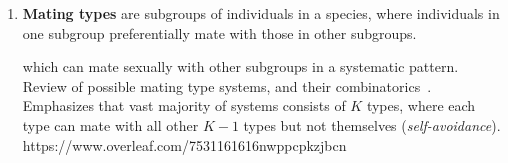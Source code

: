 \documentclass{report}
\begin{document}
\begin{enumerate}



\item \textbf{Mating types} are subgroups of individuals in a species, where individuals in one subgroup preferentially mate with those in other subgroups. 



which can mate sexually with other subgroups in a systematic pattern.  Review of possible mating type systems, and their combinatorics~\cite{bull_combinatorics_1989}. Emphasizes that vast majority of systems consists of $K$ types, where each type can mate with all other $K-1$ types but not themselves (\emph{self-avoidance}).
https://www.overleaf.com/7531161616nwppcpkzjbcn


\end{enumerate}
\end{document}
